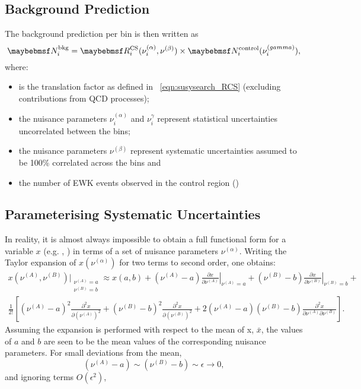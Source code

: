 \subsection{Background Prediction}
The background prediction per bin is then written as
\begin{equation*}
\NBkgi = \RCSi(\nu_i^{(\alpha)}, \nu^{(\beta)}) \times \NControli(\nu_i^{(\gamma)}),
\end{equation*}
where:
\begin{itemize}
\item \RCSi is the translation factor as defined in \eqn~\ref{eqn:susysearch_RCS}
  (excluding contributions from \ac{QCD} processes);
\item the nuisance parameters $\nu_i^{(\alpha)}$ and $\nu_i^{\gamma}$ represent
  statistical uncertainties uncorrelated between the bins;
\item the nuisance parameters $\nu^{(\beta)}$ represent systematic
  uncertainties assumed to be 100\% correlated across the bins and
\item \NControli the number of \ac{EWK} events observed in the control region
  (\LPcontrol)
\end{itemize}

\subsection{Parameterising Systematic Uncertainties}
In reality, it is almost always impossible to obtain a full functional form for
a variable $x$ (e.g. \RCSi, \NControli) in terms of a set of nuisance parameters
$\nu^{(\alpha)}$. Writing the Taylor expansion of $x(\nu^{(\alpha)})$ for two terms to
second order, one obtains:
\begin{align*}
 x(\nu^{(A)}, \nu^{(B)})\bigg|_{\substack{\nu^{(A)} = a\\ \nu^{(B)} = b}} \approx
x(a,b) +
(\nu^{(A)} - a)\left.\frac{\partial x}{\partial\nu^{(A)}}\right|_{\nu^{(A)}=a} +
(\nu^{(B)} - b)\left.\frac{\partial x}{\partial\nu^{(B)}}\right|_{\nu^{(B)}=b} +\\
\frac{1}{2!}\left[
(\nu^{(A)} - a)^2 \frac{\partial^2 x}{\partial \left(\nu^{(A)}\right)^2}
+ (\nu^{(B)} - b)^2 \frac{\partial^2 x}{\partial \left(\nu^{(B)}\right)^2}
+ 2(\nu^{(A)} - a)(\nu^{(B)} - b)\frac{\partial^2 x}{\partial
  \nu^{(A)}\partial\nu^{(B)}}
\right].
\end{align*}
Assuming the expansion is performed with respect to the mean of x, $\bar{x}$,
the values of $a$ and $b$ are seen to be the mean values of the corresponding nuisance
parameters. For small deviations from the mean,
\begin{equation*}
 (\nu^{(A)} - a) \sim (\nu^{(B)} - b) \sim \epsilon \longrightarrow 0,
\end{equation*}
and ignoring terms $O(\epsilon^2)$,

